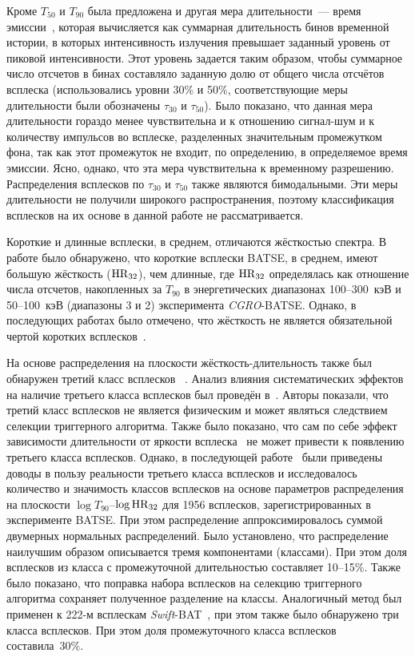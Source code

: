 Кроме $T_{50}$ и $T_{90}$ была предложена и другая мера длительности~--- время 
эмиссии~\citep{Mitrofanov_1999}, которая вычисляется как суммарная длительность 
бинов временной истории, в которых интенсивность излучения превышает заданный 
уровень от пиковой интенсивности. Этот уровень задается таким образом, чтобы 
суммарное число отсчетов в бинах составляло заданную долю от общего числа отсчётов 
всплеска (использовались уровни 30\% и 50\%, соответствующие меры длительности 
были обозначены $\tau_{30}$ и $\tau_{50}$). Было показано, что данная мера 
длительности гораздо менее чувствительна и к отношению сигнал-шум и к количеству 
импульсов во всплеске, разделенных значительным промежутком фона, так как этот 
промежуток не входит, по определению, в определяемое время эмиссии. Ясно, однако, 
что эта мера чувствительна к временному разрешению. Распределения всплесков 
по $\tau_{30}$ и $\tau_{50}$  также являются бимодальными. Эти меры длительности 
не получили широкого распространения, поэтому классификация всплесков 
на их основе в данной работе не рассматривается. 

Короткие и длинные всплески, в среднем, отличаются жёсткостью спектра.
В работе \citep{Kouveliotou_1993} было обнаружено, что короткие всплески BATSE, в 
среднем, имеют большую жёсткость (${\mathrm{HR}}_{32}$), чем длинные, где ${\mathrm{HR}}_{32}$ определялась 
как отношение числа отсчетов, накопленных за $T_{90}$ в энергетических 
диапазонах 100--300~кэВ и 50--100~кэВ (диапазоны 3 и 2) эксперимента \textit{CGRO}-BATSE. 
Однако, в последующих работах было отмечено, что жёсткость не является обязательной чертой 
коротких всплесков~\citep[см., например,][]{Sakamoto_2006_proc, Norris_and_Bonnel_2006ApJ}. 

На основе распределения на плоскости жёсткость-длительность также был обнаружен 
третий класс всплесков ~\citep{Mukherjee_1998, Hakkila_2000}. Анализ влияния 
систематических эффектов на наличие третьего класса всплесков был проведён 
в~\citep{Hakkila_2003}. Авторы показали, что третий класс всплесков не является 
физическим и может являться следствием селекции триггерного алгоритма. Также было 
показано, что сам по себе эффект зависимости длительности от яркости 
всплеска~\citep{Bonnell_1997} не может привести к появлению третьего класса всплесков. 
Однако, в последующей работе~\citep{Horvath_2006} были приведены доводы в пользу 
реальности третьего класса всплесков и исследовалось количество и значимость 
классов всплесков на основе параметров распределения на плоскости 
$\log T_{90}$--$\log {\mathrm{HR}}_{32}$ для 1956 всплесков, зарегистрированных 
в эксперименте BATSE. При этом распределение аппроксимировалось 
суммой двумерных нормальных распределений. Было установлено, что распределение 
наилучшим образом описывается тремя компонентами (классами). При этом доля всплесков 
из класса с промежуточной длительностью составляет 10--15\%. Также было показано, что поправка набора 
всплесков на селекцию триггерного алгоритма сохраняет полученное разделение на классы. 
Аналогичный метод был применен к 222-м всплескам \textit{Swift}-BAT~\citep{Horvath_2010}, 
при этом также было обнаружено три класса всплесков. При этом доля промежуточного 
класса всплесков составила~30\%.

